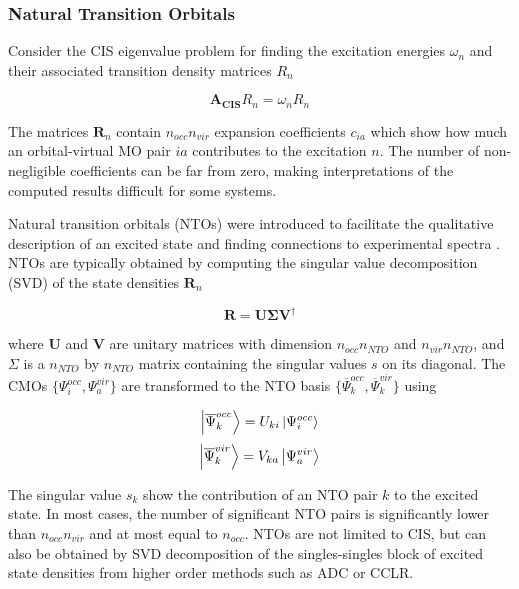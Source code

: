 \subsubsection{Natural Transition Orbitals}

Consider the CIS eigenvalue problem for finding the excitation energies $\omega_n$ and their associated transition density matrices $R_n$

\begin{equation}
\mathbf{A_{CIS}} R_n = \omega_n R_n 
\end{equation}

The matrices $\mathbf{R}_n$ contain $n_{occ}n_{vir}$ expansion coefficients $c_{ia}$ which show how much an orbital-virtual MO pair $ia$ contributes to the excitation $n$. The number of non-negligible coefficients can be far from zero, making interpretations of the computed results difficult for some systems.

Natural transition orbitals (NTOs) were introduced to facilitate the qualitative description of an excited state and finding connections to experimental spectra \cite{Luz1976, Mar2003}. NTOs are typically obtained by computing the singular value decomposition (SVD) of the state densities $\mathbf{R}_n$

\begin{equation}
\mathbf{R} = \mathbf{U} \mathbf{\Sigma} \mathbf{V}^{\dagger}  
\end{equation} 

\noindent where $\mathbf{U}$ and $\mathbf{V}$ are unitary matrices with dimension $n_{occ} n_{NTO}$ and $n_{vir}n_{NTO}$, and $\Sigma$ is a $n_{NTO}$ by $n_{NTO}$ matrix containing the singular values $s$ on its diagonal. The CMOs $\{\Psi^{occ}_i,\Psi^{vir}_a\}$ are transformed to the NTO basis $\{\overline{\Psi}^{occ}_k,\overline{\Psi}^{vir}_k\}$ using

\begin{equation}
\ket{\overline{\Psi}^{occ}_k} = U_{ki} \ket{\Psi^{occ}_i}
\end{equation}
\begin{equation}
\ket{\overline{\Psi}^{vir}_k} = V_{ka} \ket{\Psi^{vir}_a}
\end{equation}

\noindent The singular value $s_k$ show the contribution of an NTO pair $k$ to the excited state. In most cases, the number of significant NTO pairs is significantly lower than $n_{occ}n_{vir}$ and at most equal to $n_{occ}$. NTOs are not limited to CIS, but can also be obtained by SVD decomposition of the singles-singles block of excited state densities from higher order methods such as ADC or CCLR. 

